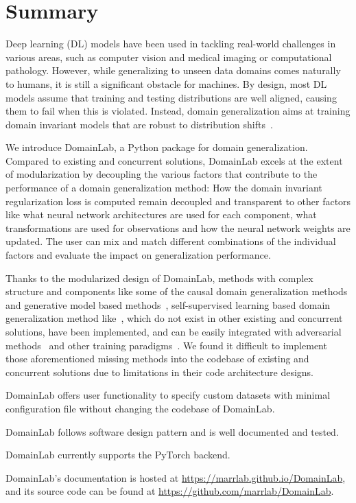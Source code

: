 \section{Summary}\label{sec:summary}
Deep learning (DL) models have been used in tackling real-world
challenges in various areas, such as computer vision and medical imaging
or computational pathology. However, while generalizing to unseen data
domains comes naturally to humans, it is still a significant obstacle
for machines. By design, most DL models assume that training and testing
distributions are well aligned, causing them to fail when this is
violated. Instead, domain generalization aims at training domain
invariant models that are robust to distribution shifts~\cite{wang2022generalizing}.

We introduce DomainLab, a Python package for domain generalization.
Compared to existing and concurrent solutions, DomainLab excels at the
extent of modularization by decoupling the various factors that
contribute to the performance of a domain generalization method: How the
domain invariant regularization loss is computed remain decoupled and
transparent to other factors like what neural network architectures are
used for each component, what transformations are used for observations
and how the neural network weights are updated. The user can mix and
match different combinations of the individual factors and evaluate the
impact on generalization performance.

Thanks to the modularized design of DomainLab, methods with complex
structure and components like some of the causal domain generalization
methods and generative model based methods~\cite{ilse2020diva, mahajan2021domain, sun2021hierarchical}, self-supervised learning based domain generalization method like~\cite{carlucci2019domain}, 
which do not exist in other existing and concurrent solutions, have been implemented, 
and can be easily integrated with adversarial methods~\cite{levi2021domain, ganin2016domain, akuzawa2020adversarial} and other training paradigms~\cite{rame2022fishr}.
We found it difficult to implement those aforementioned missing methods
into the codebase of existing and concurrent solutions due to
limitations in their code architecture designs.

DomainLab offers user functionality to specify custom datasets with
minimal configuration file without changing the codebase of DomainLab.

DomainLab follows software design pattern and is well documented and
tested.

DomainLab currently supports the PyTorch backend.

DomainLab's documentation is hosted at
\url{https://marrlab.github.io/DomainLab}, and its source code can be
found at \url{https://github.com/marrlab/DomainLab}.
